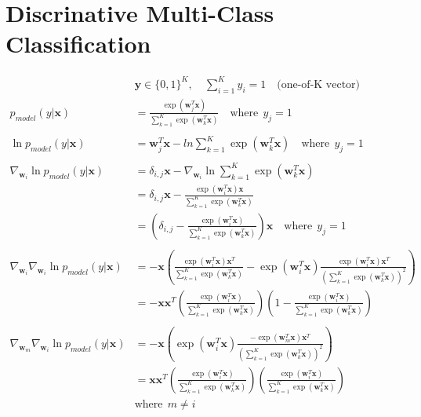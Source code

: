 \documentclass[a4]{article}
\begin{document}
\section{Discrinative Multi-Class Classification}


\begin{equation}
\begin{aligned}
&\bm{y} \in \{0,1\}^K,\hspace{1em} \sum_{i=1}^K y_i = 1 
\hspace{1em}\text{(one-of-K vector)}\\
p_{model}(y|\bm{x}) &= \frac{\exp(\bm{w}_j^T\bm{x})}
    {\sum_{k=1}^K\exp(\bm{w}_k^T\bm{x})}\hspace{1em} \text{where}\:\: y_j = 1\\
\\
\ln p_{model}(y|\bm{x}) &= \bm{w}_j^T\bm{x}
- ln \sum_{k=1}^K\exp(\bm{w}_k^T\bm{x})\hspace{1em} \text{where}\:\: y_j = 1\\
\\
\nabla_{\bm{w}_i}\ln p_{model}(y|\bm{x}) 
&= \delta_{i,j}\bm{x} 
   - \nabla_{\bm{w}_i} \ln\sum_{k=1}^K\exp(\bm{w}_k^T\bm{x})\\
&= \delta_{i,j}\bm{x} - \frac{\exp(\bm{w}_i^T\bm{x})\bm{x}}
                 {\sum_{k=1}^K\exp(\bm{w}_k^T\bm{x})}\\
&= \left(\delta_{i,j} - \frac{\exp(\bm{w}_i^T\bm{x})}
     {\sum_{k=1}^K\exp(\bm{w}_k^T\bm{x})}
   \right) \bm{x} \hspace{1em}\text{where}\:\: y_j = 1\\
\\
\nabla_{\bm{w}_i}\nabla_{\bm{w}_i}\ln p_{model}(y|\bm{x}) 
&=
-\bm{x}\left(
\frac{\exp(\bm{w}_i^T\bm{x})\bm{x}^T}
     {\sum_{k=1}^K\exp(\bm{w}_k^T\bm{x})}
- \exp(\bm{w}_i^T\bm{x})\frac{\exp(\bm{w}_i^T\bm{x})\bm{x}^T}
     {\left(\sum_{k=1}^K\exp(\bm{w}_k^T\bm{x})\right)^2}
\right)\\
&=
-\bm{x}\bm{x}^T\left(
\frac{\exp(\bm{w}_i^T\bm{x})}
     {\sum_{k=1}^K\exp(\bm{w}_k^T\bm{x})}
\right)
\left( 1 -
\frac{\exp(\bm{w}_i^T\bm{x})}
     {\sum_{k=1}^K\exp(\bm{w}_k^T\bm{x})} 
\right)\\
\\
\nabla_{\bm{w}_m}\nabla_{\bm{w}_i}\ln p_{model}(y|\bm{x}) 
&=
-\bm{x}\left(
\exp(\bm{w}_i^T\bm{x})\frac{-\exp(\bm{w}_m^T\bm{x})\bm{x}^T}
     {\left(\sum_{k=1}^K\exp(\bm{w}_k^T\bm{x})\right)^2}
\right)\\
&=
\bm{x}\bm{x}^T\left(
\frac{\exp(\bm{w}_i^T\bm{x})}
     {\sum_{k=1}^K\exp(\bm{w}_k^T\bm{x})}
\right)
\left(
\frac{\exp(\bm{w}_i^T\bm{x})}
     {\sum_{k=1}^K\exp(\bm{w}_k^T\bm{x})} 
\right)\\
&\text{where}\:\:m \ne i
\end{aligned}
\end{equation}




{}

\end{document}
